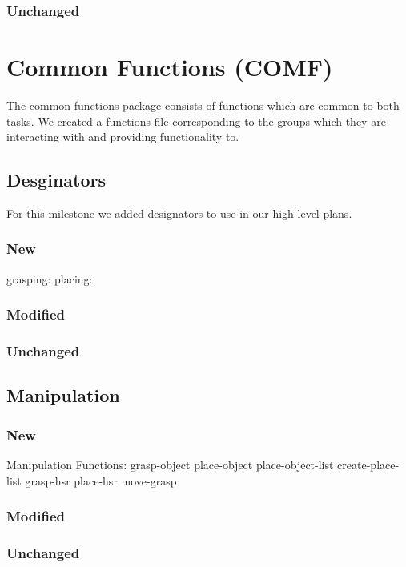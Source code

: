 \documentclass[main.tex]{subfiles}
\begin{document}
                \subsubsection{Unchanged}

                
                \section{Common Functions (COMF)}
                The common functions package consists of functions which are common to both tasks. We created a functions file corresponding to the groups which they are interacting with and providing functionality to.
                \subsection{Desginators}
                For this milestone we added designators to use in our high level plans.
                \subsubsection{New}
                grasping:
                placing:
                \subsubsection{Modified}
                \subsubsection{Unchanged}
                
                \subsection{Manipulation}
                \subsubsection{New}
                Manipulation Functions:
                grasp-object
                place-object
                place-object-list
                create-place-list
                grasp-hsr
                place-hsr
                move-grasp
                \subsubsection{Modified}
                \subsubsection{Unchanged}
                
\end{document}
